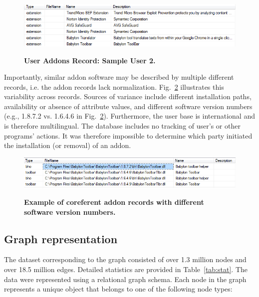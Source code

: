 \documentclass[10pt,letterpaper]{article}
\begin{document}
\begin{figure}[!h]
\caption{{\bf User Addons Record: Sample User 2.}}
\includegraphics[width=\linewidth]{figures/db_addons_snapshot_desc.png}
\label{fig:user2}
\end{figure}

Importantly, similar addon software may be described by multiple different records, i.e. the addon records lack normalization. Fig.~\ref{fig:example} illustrates this variability across records. Sources of variance include different installation paths, availability or absence of attribute values, and different software version numbers (e.g., 1.8.7.2 vs. 1.6.4.6 in Fig.~\ref{fig:example}). Furthermore, the user base is international and is therefore multilingual. The database includes no tracking of user's or other programs' actions. It was therefore impossible to determine which party initiated the installation (or removal) of an addon.  

\begin{figure}[!h]
\caption{{\bf Example of coreferent addon records with different software version numbers.}}
\includegraphics[width=\linewidth]{figures/addons_versioning_snapshot.png}
\label{fig:example}
\end{figure}

\subsection*{Graph representation}

The dataset corresponding to the graph consisted of over 1.3 million nodes and over 18.5 million edges. Detailed statistics are provided in Table~\ref{tab:stat}. The data were represented using a relational graph schema. Each node in the graph represents a unique object that belongs to one of the following node types:   
\end{document}
